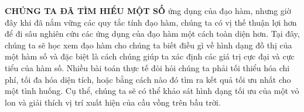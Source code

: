 \vspace{1.8em}

\noindent
\hspace*{\dimexpr 1.4in + 32pt\relax}%
\begin{minipage}[t]{\dimexpr\textwidth - 1.4in - 32pt\relax}
    {\fontsize{10.5}{15}\selectfont\color{stewartdark}
    \textbf{CHÚNG TA ĐÃ TÌM HIỂU MỘT SỐ} ứng dụng của đạo hàm, nhưng giờ đây khi đã nắm vững các quy tắc tính đạo hàm, chúng ta có vị thế thuận lợi hơn để đi sâu nghiên cứu các ứng dụng của đạo hàm một cách toàn diện hơn. Tại đây, chúng ta sẽ học xem đạo hàm cho chúng ta biết điều gì về hình dạng đồ thị của một hàm số và đặc biệt là cách chúng giúp ta xác định các giá trị cực đại và cực tiểu của hàm số. Nhiều bài toán thực tế đòi hỏi chúng ta phải tối thiểu hóa chi phí, tối đa hóa diện tích, hoặc bằng cách nào đó tìm ra kết quả tối ưu nhất cho một tình huống. Cụ thể, chúng ta sẽ có thể khảo sát hình dạng tối ưu của một vỏ lon và giải thích vị trí xuất hiện của cầu vồng trên bầu trời.
    \par}
\end{minipage}
